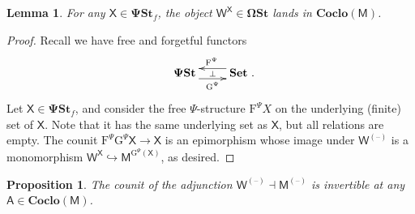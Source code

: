 \documentclass[11pt, a4paper, twoside,leqno]{amsart}
\def\blue{\leavevmode\color{blue}}%
\newcommand{\cat}[1]{\mathbf{#1}}
\newcommand{\thg}{{\mathord{\text{--}}}}
\newcommand{\cd}[2][]{\vcenter{\hbox{\xymatrix#1{#2}}}}
\numberwithin{equation}{section}
\theoremstyle{plain}
\newtheorem{Prop}[Thm]{Proposition}
\newtheorem{Lemma}[Thm]{Lemma}
\theoremstyle{definition}
\newcommand{\Set}{\cat{Set}}
\begin{document}
\begin{Lemma}
  \label{lem:WexpY-in-ISPfM}
  For any \(\mathsf{X} \in \cat{\Psi St}_{f}\), the object \(\mathsf{W}^{\mathsf{X}} \in
  \cat{\Omega St}\) lands in \(\cat{Coclo}(\mathsf{M})\).
\end{Lemma}
\begin{proof}
  
  Recall we have free and forgetful functors
  \begin{equation}
    \label{eq:psi-free-forget}
    \cd{
      {\cat{\Psi St}}
      \ar@<-4.5pt>[r]_-{\mathrm{G}^{\Psi}}
      \ar@{<-}@<4.5pt>[r]^{\mathrm{F}^{\Psi}} \ar@{}[r]|-{\bot} &
      {\Set}
      \rlap{ .}
    }
  \end{equation}
  Let \(\mathsf{X}\in \cat{\Psi St}_{f}\), and consider the free
  \(\Psi\)-structure
  \(\mathrm{F}^{\Psi}X\) on the underlying (finite) set of
  \(\mathsf{X}\). Note that it has the same underlying set as
  \(\mathsf{X}\), but
  all relations are empty. The counit  \(\mathrm{F}^{\Psi}\mathrm{G}^{\Psi}
  \mathsf{X}
  \rightarrow \mathsf{X}\) is an epimorphism
  whose image under
  $\mathsf{W}^{(\thg)}$ is a monomorphism
  $\mathsf{W}^{\mathsf{X}} \hookrightarrow \mathsf{M}^{\mathrm{G}^{\Psi}(\mathsf{X})}$, as desired.
\end{proof}


\begin{Prop}
  \label{prop:adj-M-W-counit-invble}
  The counit of the adjunction
  $\mathsf{W}^{(\thg)} \dashv \mathsf{M}^{(\thg)}$ is invertible at
  any \(\mathsf{A} \in \cat{Coclo}(\mathsf{M})\).
\end{Prop}
\end{document}
